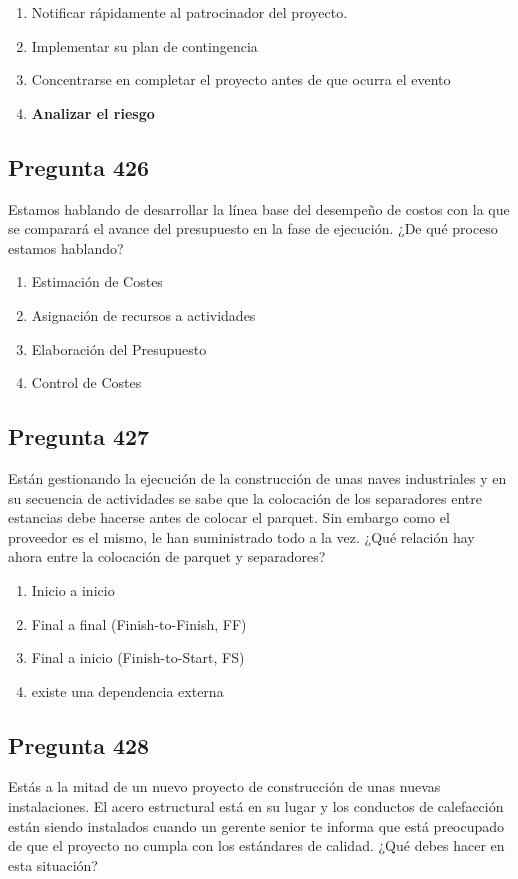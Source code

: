 \documentclass[11pt,a4paper]{article}
\begin{document}
\begin{enumerate}[label=\alph*)]
  \item Notificar rápidamente al patrocinador del proyecto.
  \item Implementar su plan de contingencia
  \item Concentrarse en completar el proyecto antes de que ocurra el evento
  \item \textbf{Analizar el riesgo}
\end{enumerate}

\subsection*{Pregunta 426}
Estamos hablando de desarrollar la línea base del desempeño de costos con la que se comparará el avance del presupuesto en la fase de ejecución. ¿De qué proceso estamos hablando?

\begin{enumerate}[label=\alph*)]
  \item Estimación de Costes
  \item Asignación de recursos a actividades
  \item Elaboración del Presupuesto
  \item Control de Costes
\end{enumerate}

\subsection*{Pregunta 427}
Están gestionando la ejecución de la construcción de unas naves industriales y en su secuencia de actividades se sabe que la colocación de los separadores entre estancias debe hacerse antes de colocar el parquet. Sin embargo como el proveedor es el mismo, le han suministrado todo a la vez. ¿Qué relación hay ahora entre la colocación de parquet y separadores?

\begin{enumerate}[label=\alph*)]
  \item Inicio a inicio
  \item Final a final (Finish-to-Finish, FF)
  \item Final a inicio (Finish-to-Start, FS)
  \item existe una dependencia externa
\end{enumerate}

\subsection*{Pregunta 428}
Estás a la mitad de un nuevo proyecto de construcción de unas nuevas instalaciones. El acero estructural está en su lugar y los conductos de calefacción están siendo instalados cuando un gerente senior te informa que está preocupado de que el proyecto no cumpla con los estándares de calidad. ¿Qué debes hacer en esta situación?
\end{document}
